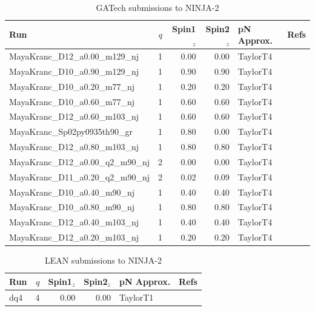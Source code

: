 \begin{table}
\begin{center}
\begin{tabular}{|l|r|r|r|l|c|}
\hline
Run & $q$ & Spin1${}_z$ & Spin2${}_z$ & pN Approx. & Refs \\
\hline
MayaKranc\_D12\_a0.00\_m129\_nj & 1 & 0.00 & 0.00 & TaylorT4 & \cite{,} \\
MayaKranc\_D10\_a0.90\_m129\_nj & 1 & 0.90 & 0.90 & TaylorT4 & \cite{,} \\
MayaKranc\_D10\_a0.20\_m77\_nj & 1 & 0.20 & 0.20 & TaylorT4 & \cite{,} \\
MayaKranc\_D10\_a0.60\_m77\_nj & 1 & 0.60 & 0.60 & TaylorT4 & \cite{,} \\
MayaKranc\_D12\_a0.60\_m103\_nj & 1 & 0.60 & 0.60 & TaylorT4 & \cite{,} \\
MayaKranc\_Sp02py0935th90\_gr & 1 & 0.80 & 0.00 & TaylorT4 & \cite{,} \\
MayaKranc\_D12\_a0.80\_m103\_nj & 1 & 0.80 & 0.80 & TaylorT4 & \cite{,} \\
MayaKranc\_D12\_a0.00\_q2\_m90\_nj & 2 & 0.00 & 0.00 & TaylorT4 & \cite{,} \\
MayaKranc\_D11\_a0.20\_q2\_m90\_nj & 2 & 0.02 & 0.09 & TaylorT4 & \cite{,} \\
MayaKranc\_D10\_a0.40\_m90\_nj & 1 & 0.40 & 0.40 & TaylorT4 & \cite{,} \\
MayaKranc\_D10\_a0.80\_m90\_nj & 1 & 0.80 & 0.80 & TaylorT4 & \cite{,} \\
MayaKranc\_D12\_a0.40\_m103\_nj & 1 & 0.40 & 0.40 & TaylorT4 & \cite{,} \\
MayaKranc\_D12\_a0.20\_m103\_nj & 1 & 0.20 & 0.20 & TaylorT4 & \cite{,} \\
\hline
\end{tabular}
\end{center}
\caption[GATech submissions to NINJA-2]{
\label{tab:ninja2_gatech}
GATech submissions to NINJA-2}
\end{table}

\begin{table}
\begin{center}
\begin{tabular}{|l|r|r|r|l|c|}
\hline
Run & $q$ & Spin1${}_z$ & Spin2${}_z$ & pN Approx. & Refs \\
\hline
dq4 & 4 & 0.00 & 0.00 & TaylorT1 & \cite{,Sperhake:2006cy} \\
\hline
\end{tabular}
\end{center}
\caption[LEAN submissions to NINJA-2]{
\label{tab:ninja2_lean}
LEAN submissions to NINJA-2}
\end{table}

